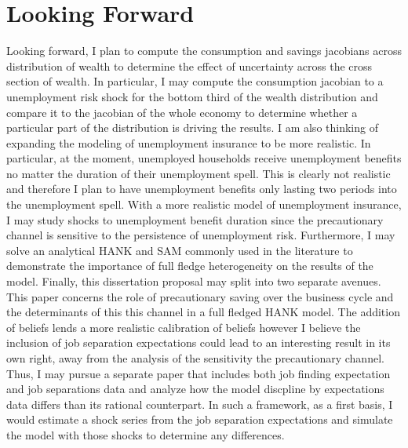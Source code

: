 \documentclass[titlepage]{\econtex}\providecommand{\texname}{Dissertation-Proposal}
\providecommand{\FigDir}{Figures}
\begin{document}





\hypertarget{Looking Forward }{}
\section{Looking Forward }

Looking forward, I plan to compute the consumption and savings jacobians across distribution of wealth to determine the effect of uncertainty across the cross section of wealth. In particular, I may compute the consumption jacobian to a unemployment risk shock for the bottom third of the wealth distribution and compare it to the jacobian of the whole economy to determine whether a particular part of the distribution is driving the results. I am also thinking of expanding the modeling of unemployment insurance to be more realistic. In particular, at the moment, unemployed households receive unemployment benefits no matter the duration of their unemployment spell. This is clearly not realistic and therefore I plan to have unemployment benefits only lasting two periods into the unemployment spell. With a more realistic model of unemployment insurance, I may study shocks to unemployment benefit duration since the precautionary channel is sensitive to the persistence of unemployment risk. Furthermore, I may solve an analytical HANK and SAM commonly used in the literature to demonstrate the importance of full fledge heterogeneity on the results of the model. Finally, this dissertation proposal may split into two separate avenues. This paper concerns the role of precautionary saving over the business cycle and the determinants of this this channel in a full fledged HANK model. The addition of beliefs lends a more realistic calibration of beliefs however I believe the inclusion of job separation expectations could lead to an interesting result in its own right, away from the analysis of the sensitivity the precautionary channel. Thus, I may pursue a separate paper that includes both job finding expectation and job separations data and analyze how the model discpline by expectations data differs than its rational counterpart. In such a framework, as a first basis, I would estimate a shock series from the job separation expectations and simulate the model with those shocks to determine any differences.
\end{document}
